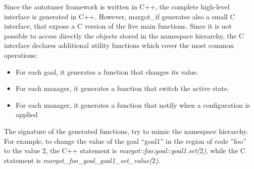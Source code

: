 Since the autotuner framework is written in C++, the complete high-level interface is generated in C++.
However, margot\_if generates also a small C interface, that expose a C version of the five main functions.
Since it is not possible to access directly the objects stored in the namespace hierarchy, the C interface declares additional utility functions which cover the most common operations:
\begin{itemize}
	\item For each goal, it generates a function that changes its value.
	\item For each manager, it generates a function that switch the active state.
	\item For each manager, it generates a function that notify when a configuration is applied
\end{itemize}
The signature of the generated functions, try to mimic the namespace hierarchy.
For example, to change the value of the goal ``goal1'' in the region of code ''foo'' to the value $2$, the C++ statement is \textit{margot::foo:goal::goal1.set($2$)}, while the C statement is \textit{margot\_foo\_goal\_goal1\_set\_value($2$)}.


